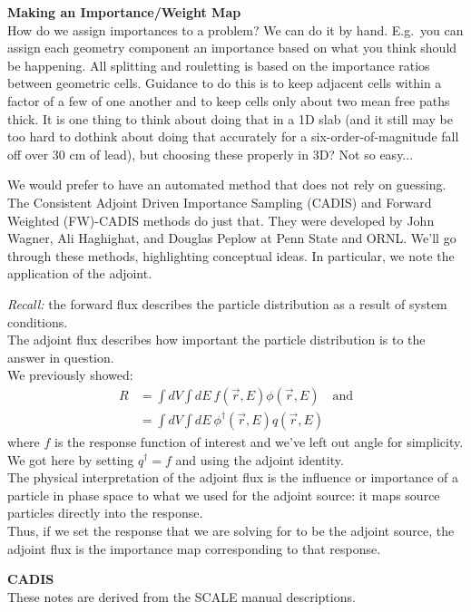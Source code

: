 \documentclass[12pt]{article}
\begin{document}
\textbf{Making an Importance/Weight Map}\\
How do we assign importances to a problem? We can do it by hand. E.g.\ you can assign each geometry component an importance based on what you think should be happening. All splitting and rouletting is based on the importance ratios between geometric cells. Guidance to do this is to keep adjacent cells within a factor of a few of one another and to keep cells only about two mean free paths thick. It is one thing to think about doing that in a 1D slab (and it still may be too hard to do\textemdash think about doing that accurately for a six-order-of-magnitude fall off over 30 cm of lead), but choosing these properly in 3D? Not so easy...

We would prefer to have an automated method that does not rely on guessing. The Consistent Adjoint Driven Importance Sampling (CADIS) and Forward Weighted (FW)-CADIS methods do just that. They were developed by John Wagner, Ali Haghighat, and Douglas Peplow at Penn State and ORNL. We'll go through these methods, highlighting conceptual ideas. In particular, we note the application of the adjoint.   

\textit{Recall:} the forward flux describes the particle distribution as a result of system conditions. \\
The adjoint flux describes how important the particle distribution is to the answer in question. \\
We previously showed:
\begin{align*}
R &= \int dV \int dE\: f(\vec{r}, E) \phi(\vec{r}, E) \quad \text{and}\\
&= \int dV \int dE\: \phi^{\dagger}(\vec{r}, E) q(\vec{r}, E)
\end{align*}
where $f$ is the response function of interest and we've left out angle for simplicity.\\
We got here by setting $q^{\dagger} = f$ and using the adjoint identity. \\
The physical interpretation of the adjoint flux is the influence or importance of a particle in phase space to what we used for the adjoint source: it maps source particles directly into the response. \\
Thus, if we set the response that we are solving for to be the adjoint source, the adjoint flux is the importance map corresponding to that response. 

\textbf{CADIS}\\
These notes are derived from the SCALE manual descriptions. 
\end{document}
